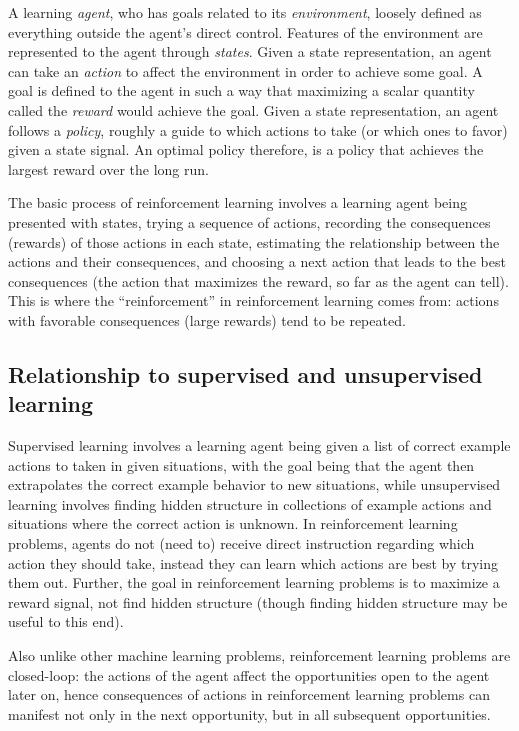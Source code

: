 \documentclass[12pt]{article}
\begin{document}
A learning \emph{agent}, who has goals related to its \emph{environment}, loosely defined as everything outside the agent's direct control. Features of the environment are represented to the agent through \emph{states}. Given a state representation, an agent can take an \emph{action} to affect the environment in order to achieve some goal. A goal is defined to the agent in such a way that maximizing a scalar quantity called the \emph{reward} would achieve the goal. Given a state representation, an agent follows a \emph{policy}, roughly a guide to which actions to take (or which ones to favor) given a state signal. An optimal policy therefore, is a policy that achieves the largest reward over the long run.

The basic process of reinforcement learning involves a learning agent being presented with states, trying a sequence of actions, recording the consequences (rewards) of those actions in each state, estimating the relationship between the actions and their consequences, and choosing a next action that leads to the best consequences (the action that maximizes the reward, so far as the agent can tell). This is where the ``reinforcement'' in reinforcement learning comes from: actions with favorable consequences (large rewards) tend to be repeated.


\subsection{Relationship to supervised and unsupervised learning} %
\label{sub:relationship_to_supervise_and_unsupervised_learning}

Supervised learning involves a learning agent being given a list of  correct example actions to taken in given situations, with the goal being that the agent then extrapolates the correct example behavior to new situations, while unsupervised learning involves finding hidden structure in collections of example actions and situations where the correct action is unknown. In reinforcement learning problems, agents do not (need to) receive direct instruction regarding which action they should take, instead they can learn which actions are best by trying them out. Further, the goal in reinforcement learning problems is to maximize a reward signal, not find hidden structure (though finding hidden structure may be useful to this end).

Also unlike other machine learning problems, reinforcement learning problems are closed-loop: the actions of the agent affect the opportunities open to the agent later on, hence consequences of actions in reinforcement learning problems can manifest not only in the next opportunity, but in all subsequent opportunities.
\end{document}
